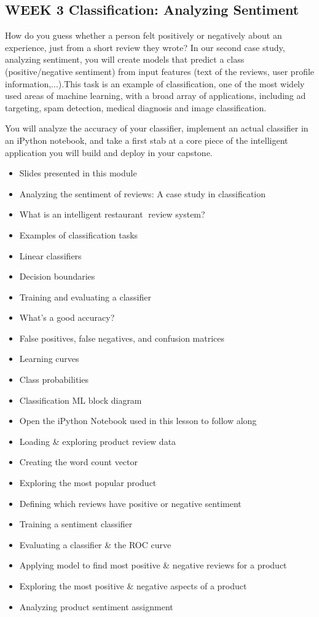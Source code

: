 \subsection{WEEK 3
Classification: Analyzing Sentiment}
How do you guess whether a person felt positively or negatively about an experience, just from a short review they wrote?
In our second case study, analyzing sentiment, you will create models that predict a class (positive/negative sentiment) from input features (text of the reviews, user profile information,...).This task is an example of classification, one of the most widely used areas of machine learning, with a broad array of applications, including ad targeting, spam detection, medical diagnosis and image classification.

You will analyze the accuracy of your classifier, implement an actual classifier in an iPython notebook, and take a first stab at a core piece of the intelligent application you will build and deploy in your capstone.
\begin{itemize}
\item Slides presented in this module
\item Analyzing the sentiment of reviews: A case study in classification
\item What is an intelligent restaurant review system?
\item Examples of classification tasks
\item Linear classifiers
\item Decision boundaries
\item Training and evaluating a classifier
\item What's a good accuracy?
\item False positives, false negatives, and confusion matrices
\item Learning curves
\item Class probabilities
\item Classification ML block diagram
\item Open the iPython Notebook used in this lesson to follow along
\item Loading \& exploring product review data
\item Creating the word count vector
\item Exploring the most popular product
\item Defining which reviews have positive or negative sentiment
\item Training a sentiment classifier
\item Evaluating a classifier \& the ROC curve
\item Applying model to find most positive \& negative reviews for a product
\item Exploring the most positive \& negative aspects of a product
\item Analyzing product sentiment assignment
\end{itemize}
